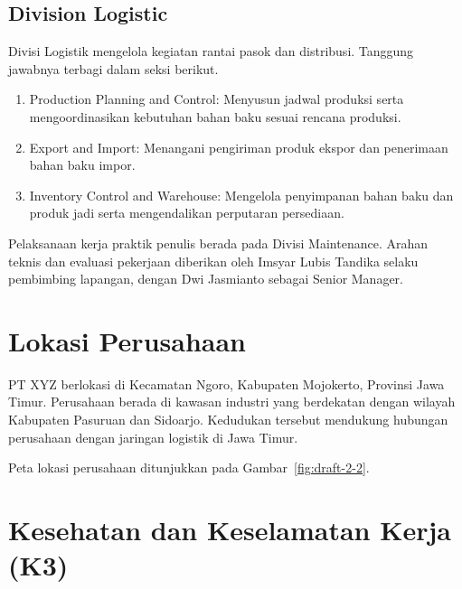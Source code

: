 \subsection{Division Logistic}

Divisi Logistik mengelola kegiatan rantai pasok dan distribusi. Tanggung jawabnya terbagi dalam seksi berikut.

\begin{enumerate}[leftmargin=*,itemsep=2pt]
\item Production Planning and Control: Menyusun jadwal produksi serta mengoordinasikan kebutuhan bahan baku sesuai rencana produksi.

\item Export and Import: Menangani pengiriman produk ekspor dan penerimaan bahan baku impor.

\item Inventory Control and Warehouse: Mengelola penyimpanan bahan baku dan produk jadi serta mengendalikan perputaran persediaan.

\end{enumerate}

Pelaksanaan kerja praktik penulis berada pada Divisi Maintenance. Arahan teknis dan evaluasi pekerjaan diberikan oleh Imsyar Lubis Tandika selaku pembimbing lapangan, dengan Dwi Jasmianto sebagai Senior Manager.

\Needspace{13.5cm}
\section{Lokasi Perusahaan}

PT XYZ berlokasi di Kecamatan Ngoro, Kabupaten Mojokerto, Provinsi Jawa Timur. Perusahaan berada di kawasan industri yang berdekatan dengan wilayah Kabupaten Pasuruan dan Sidoarjo. Kedudukan tersebut mendukung hubungan perusahaan dengan jaringan logistik di Jawa Timur.

Peta lokasi perusahaan ditunjukkan pada Gambar~\ref{fig:draft-2-2}.


\section{Kesehatan dan Keselamatan Kerja (K3)}

